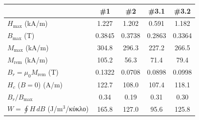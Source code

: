 \begin{tabular}{lcccc}
\toprule
& \textlatin{\#}1 & \textlatin{\#}2 & \textlatin{\#}3.1 & \textlatin{\#}3.2 \\
\midrule
$H_{\max}$ (\textlatin{kA/m}) & 1.227 & 1.202 & 0.591 & 1.182 \\
$B_{\max}$ (\textlatin{T}) & 0.3845 & 0.3738 & 0.2863 & 0.3364 \\
$M_{\max}$ (\textlatin{kA/m}) & 304.8 & 296.3 & 227.2 & 266.5 \\
$M_{\mathrm{rem}}$ (\textlatin{kA/m}) & 105.2 & 56.3 & 71.4 & 79.4 \\
$B_r=\mu_0M_{\mathrm{rem}}$ (\textlatin{T}) & 0.1322 & 0.0708 & 0.0898 & 0.0998 \\
$H_c$ ($B=0$) (\textlatin{A/m}) & 122.7 & 108.0 & 107.4 & 118.1 \\
$B_r/B_{\max}$ & 0.34 & 0.19 & 0.31 & 0.30 \\
$W=\oint H\,dB$ (\textlatin{J/m}$^3$/κύκλο) & 165.8 & 127.0 & 95.6 & 125.8 \\
\bottomrule
\end{tabular}
